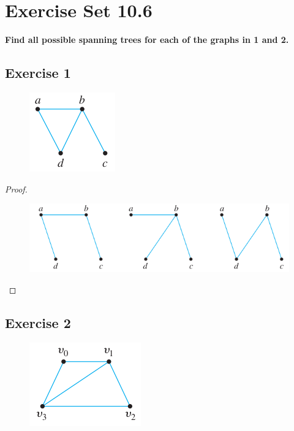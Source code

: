 \documentclass[14pt]{extarticle}
\newcommand{\cy}{\color{cyan}}
\begin{document}
\section{Exercise Set 10.6}
{\bf \cy Find all possible spanning trees for each of the graphs in 1 and 2.}

\subsection{Exercise 1}
\begin{figure}[ht!]
\centering
\includegraphics[scale=0.5]{../images/10.6.1.png}
\end{figure}

\begin{proof}
\begin{figure}[ht!]
\centering
\includegraphics[scale=0.4]{../images/10.6.1.2.png}
\end{figure}
\end{proof}

\subsection{Exercise 2}
\begin{figure}[ht!]
\centering
\includegraphics[scale=0.5]{../images/10.6.2.png}
\end{figure}
\end{document}
